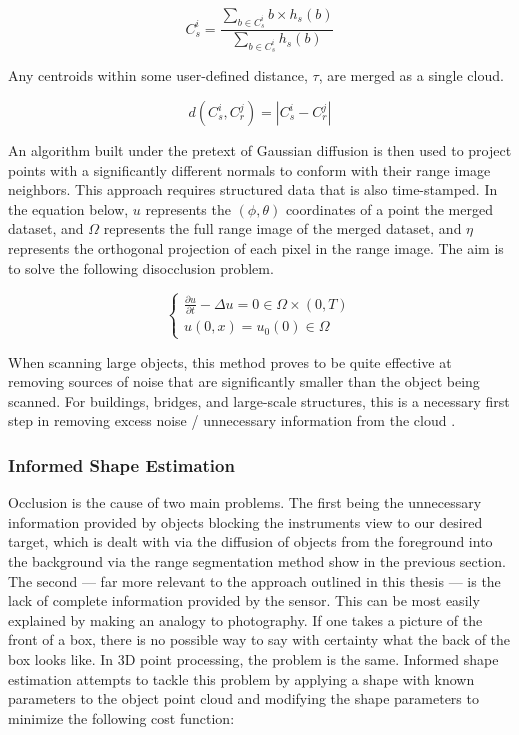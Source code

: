\documentclass[12pt]{drexelthesis}
\let\Oldsubsubsection\subsubsection
\renewcommand{\subsubsection}{\FloatBarrier\Oldsubsubsection}
\begin{document}
\begin{equation}
	C_{s}^{i} = \frac{\sum_{b\in C_{s}^{i}} b  \times h_{s}(b)}{\sum_{b\in C_{s}^{i}}h_{s}(b)}
\end{equation}

Any centroids within some user-defined distance, $\tau$, are merged as a single cloud.

\begin{equation}
	d(C_{s}^{i}, C_{r}^{j}) = |C_{s}^{i} - C_{r}^{j}|
\end{equation}

An algorithm built under the pretext of Gaussian diffusion is then used to project points with a significantly different normals to conform with their range image neighbors. This approach requires structured data that is also time-stamped. In the equation below, $u$ represents the $(\phi, \theta)$ coordinates of a point the merged dataset, and $\Omega$  represents the full range image of the merged dataset, and $\eta$ represents the orthogonal projection of each pixel in the range image. The aim is to solve the following disocclusion problem.

\begin{equation}
		\begin{cases}
			\frac{\partial u}{\partial t} - \Delta u = 0 \in \Omega \times (0,T) \\
			u(0,x) = u_{0}(0) \in \Omega
		\end{cases}
\end{equation}

When scanning large objects, this method proves to be quite effective at removing sources of noise that are significantly smaller than the object being scanned. For buildings, bridges, and large-scale structures, this is a necessary first step in removing excess noise / unnecessary information from the cloud \cite{RN13}.


\subsubsection{Informed Shape Estimation}
Occlusion is the cause of two main problems. The first being the unnecessary information provided by objects blocking the instruments view to our desired target, which is dealt with via the diffusion of objects from the foreground into the background via the range segmentation method show in the previous section. The second --- far more relevant to the approach outlined in this thesis --- is the lack of complete information provided by the sensor. This can be most easily explained by making an analogy to photography. If one takes a picture of the front of a box, there is no possible way to say with certainty what the back of the box looks like. In 3D point processing, the problem is the same. Informed shape estimation attempts to tackle this problem by applying a shape with known parameters to the object point cloud and modifying the shape parameters to minimize the following cost function:
\end{document}
